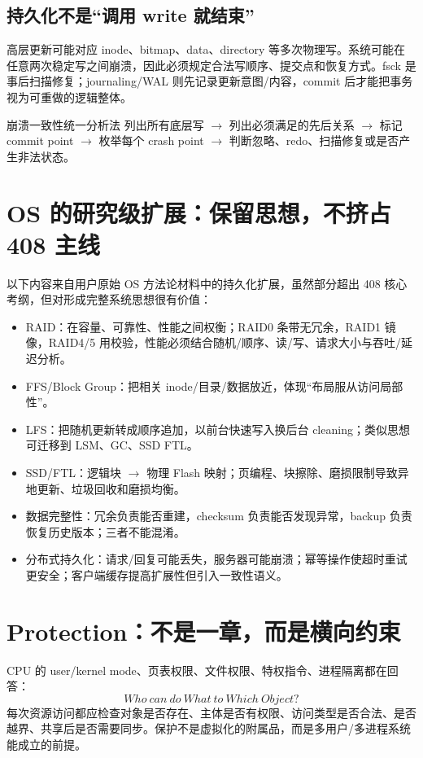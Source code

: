 \documentclass[11pt,a4paper,openany]{ctexbook}
\begin{document}
\subsection{持久化不是“调用 write 就结束”}
高层更新可能对应 inode、bitmap、data、directory 等多次物理写。系统可能在任意两次稳定写之间崩溃，因此必须规定合法写顺序、提交点和恢复方式。fsck 是事后扫描修复；journaling/WAL 则先记录更新意图/内容，commit 后才能把事务视为可重做的逻辑整体。

\begin{methodbox}{崩溃一致性统一分析法}
列出所有底层写 $\rightarrow$ 列出必须满足的先后关系 $\rightarrow$ 标记 commit point $\rightarrow$ 枚举每个 crash point $\rightarrow$ 判断忽略、redo、扫描修复或是否产生非法状态。
\end{methodbox}

\section{OS 的研究级扩展：保留思想，不挤占 408 主线}
以下内容来自用户原始 OS 方法论材料中的持久化扩展，虽然部分超出 408 核心考纲，但对形成完整系统思想很有价值：
\begin{itemize}
  \item RAID：在容量、可靠性、性能之间权衡；RAID0 条带无冗余，RAID1 镜像，RAID4/5 用校验，性能必须结合随机/顺序、读/写、请求大小与吞吐/延迟分析。
  \item FFS/Block Group：把相关 inode/目录/数据放近，体现“布局服从访问局部性”。
  \item LFS：把随机更新转成顺序追加，以前台快速写入换后台 cleaning；类似思想可迁移到 LSM、GC、SSD FTL。
  \item SSD/FTL：逻辑块 $\rightarrow$ 物理 Flash 映射；页编程、块擦除、磨损限制导致异地更新、垃圾回收和磨损均衡。
  \item 数据完整性：冗余负责能否重建，checksum 负责能否发现异常，backup 负责恢复历史版本；三者不能混淆。
  \item 分布式持久化：请求/回复可能丢失，服务器可能崩溃；幂等操作使超时重试更安全；客户端缓存提高扩展性但引入一致性语义。
\end{itemize}

\section{Protection：不是一章，而是横向约束}
CPU 的 user/kernel mode、页表权限、文件权限、特权指令、进程隔离都在回答：
\[
\boxed{Who\ can\ do\ What\ to\ Which\ Object?}
\]
每次资源访问都应检查对象是否存在、主体是否有权限、访问类型是否合法、是否越界、共享后是否需要同步。保护不是虚拟化的附属品，而是多用户/多进程系统能成立的前提。
\end{document}
